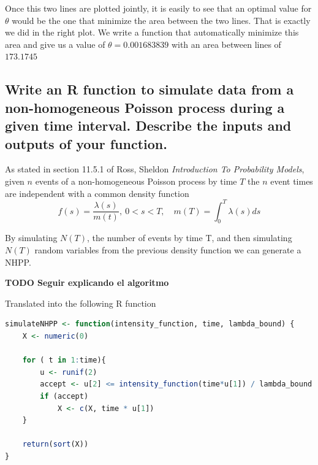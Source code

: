 Once this two lines are plotted jointly, it is easily to see that an optimal value for $\theta$ would be the one that minimize the area between the two lines. 
That is exactly we did in the right plot. 
We write a function that automatically minimize this area and give us a value of $\theta=0.001683839$ with an area between lines of $173.1745$

\subsection{Write an R function to simulate data from a non-homogeneous Poisson process during a given time interval. Describe the inputs and outputs of your function.}

As stated in section 11.5.1 of Ross, Sheldon \textit{Introduction To Probability Models}, given $n$ events of a non-homogeneous Poisson process by time $T$ the $n$ event times are independent with a common density function
\[f(s) = \frac{\lambda(s)}{m(t)},\ 0<s<T, \quad m(T) = \int^T_0\lambda(s)ds\]

By simulating $N(T)$, the number of events by time T, and then simulating $N(T)$ random variables from the previous density function we can generate a NHPP.

\textbf{TODO Seguir explicando el algoritmo}

Translated into the following R function
\begin{lstlisting}[language=r]
simulateNHPP <- function(intensity_function, time, lambda_bound) {
	X <- numeric(0)
	
	for ( t in 1:time){
		u <- runif(2)
		accept <- u[2] <= intensity_function(time*u[1]) / lambda_bound
		if (accept)
			X <- c(X, time * u[1])
	}
		
	return(sort(X))
}
\end{lstlisting}
